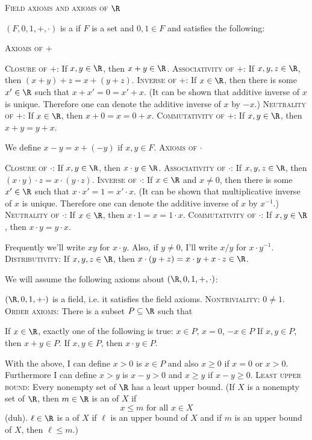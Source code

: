 \textsc{Field axioms and axioms of $\R$}

$(F, 0, 1, +, \cdot)$ is a  if
$F$ is a set and $0,1 \in F$ and satisfies the following:
\begin{enumerate}
  \li \textsc{Axioms of $+$}
  \begin{myenumt}
    \li \textsc{Closure of $+$}: If $x, y \in \R$, then $x + y \in \R$.
    \li \textsc{Associativity of $+$}: If $x, y, z \in \R$, then
    $(x + y) + z = x + (y + z)$.
    \li \textsc{Inverse of $+$}: If $x \in \R$, then
    there is some $x' \in \R$ such that $x + x' = 0 = x' + x$.
    (It can be shown that additive inverse of $x$ is unique.
    Therefore one can denote the additive inverse of $x$ by $-x$.)
    \li \textsc{Neutrality of $+$}:
    If $x \in \R$, then $x + 0 = x = 0 + x$.
    \li \textsc{Commutativity of $+$}:
    If $x, y \in \R$, then $x + y = y + x$.
  \end{myenumt}
  We define $x - y = x + (-y)$ if $x, y \in F$.
  \li \textsc{Axioms of $\cdot$}
  \begin{myenumt}
    \li \textsc{Closure of $\cdot$}: If $x, y \in \R$, then $x \cdot y \in \R$.
    \li \textsc{Associativity of $\cdot$}: If $x, y, z \in \R$, then
    $(x \cdot y) \cdot z = x \cdot (y \cdot z)$.
    \li \textsc{Inverse of $\cdot$}: If $x \in \R$ and $x \neq 0$, then
    there is some $x' \in \R$ such that $x \cdot x' = 1 = x' \cdot x$.
    (It can be shown that multiplicative inverse of $x$ is unique.
    Therefore one can denote the additive inverse of $x$ by $x^{-1}$.)
    \li \textsc{Neutrality of $\cdot$}:
    If $x \in \R$, then $x \cdot 1 = x = 1 \cdot x$.
    \li \textsc{Commutativity of $\cdot$}:
    If $x, y \in \R$, then $x \cdot y = y \cdot x$.
  \end{myenumt}
  Frequently we'll write $xy$ for $x \cdot y$.
  Also, if $y \neq 0$, I'll write $x/y$ for $x \cdot y^{-1}$.
  \li \textsc{Distributivity}:
  If $x, y, z \in \R$, then $x \cdot (y  + z) = x \cdot y + x \cdot z \in \R$.
\end{enumerate}
We will assume the following axioms about $(\R, 0, 1, +, \cdot)$:
\begin{enumerate}
  \li $(\R, 0, 1, + \cdot)$ is a field, i.e. it satisfies the field axioms.
  \li \textsc{Nontriviality}: $0 \neq 1$.
  \li \textsc{Order axioms}: There is a subset $P \subseteq \R$ such that
  \begin{myenumt}
    \li If $x \in \R$, exactly one of the following is true:
    $x \in P$, $x = 0$, $-x \in P$
    \li If $x, y \in P$, then $x + y \in P$.
    \li If $x, y \in P$, then $x \cdot y \in P$.
  \end{myenumt}
  With the above, I can define $x > 0$ is $x \in P$
  and also $x \geq 0$ if $x = 0$ or $x > 0$.
  Furthermore I can define $x > y$ is $x - y > 0$ and $x \geq y$ if
  $x - y \geq 0$.
  \li \textsc{Least upper bound}:
  Every nonempty set of $\R$ has a least upper bound.
  (If $X$ is a nonempty set of $\R$, then $m \in \R$ is an 
  of
  $X$ if
  \[
  x \leq m \text{ for all $x \in X$}
  \]
  (duh).
  $\ell \in \R$ is a  of
  $X$ if $\ell$ is an upper bound of $X$
  and if $m$ is an upper bound of $X$, then $\ell \leq m$.)
\end{enumerate}
